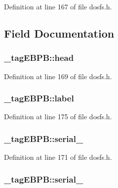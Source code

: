 Definition at line 167 of file dosfs.\-h.



\subsection{Field Documentation}
\hypertarget{struct__tag_e_b_p_b_a797eed469b81e637435a6c260c890689}{
\subsubsection[{head}]{ \-\_\-tag\-E\-B\-P\-B\-::head}}\label{struct__tag_e_b_p_b_a797eed469b81e637435a6c260c890689}


Definition at line 169 of file dosfs.\-h.

\hypertarget{struct__tag_e_b_p_b_a71b31272ca2e5e4db7b48e21ba408ab4}{
\subsubsection[{label}]{ \-\_\-tag\-E\-B\-P\-B\-::label}}\label{struct__tag_e_b_p_b_a71b31272ca2e5e4db7b48e21ba408ab4}


Definition at line 175 of file dosfs.\-h.

\hypertarget{struct__tag_e_b_p_b_a20c88e6e9746be8ac63672f2a2ff1ab5}{
\subsubsection[{serial\-\_\-0}]{ \-\_\-tag\-E\-B\-P\-B\-::serial\-\_}}\label{struct__tag_e_b_p_b_a20c88e6e9746be8ac63672f2a2ff1ab5}


Definition at line 171 of file dosfs.\-h.

\hypertarget{struct__tag_e_b_p_b_a4a0ef14d9943dd5edd16183125e2566d}{
\subsubsection[{serial\-\_\-1}]{ \-\_\-tag\-E\-B\-P\-B\-::serial\-\_}}\label{struct__tag_e_b_p_b_a4a0ef14d9943dd5edd16183125e2566d}


